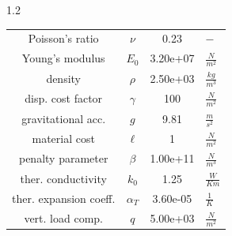 \documentclass[preview]{standalone}
\begin{document}
\begin{spacing}{1.2}
\begin{tabular}{cccl}
\toprule
Poisson's ratio & $\nu$ & 0.23 & $-$ \\ 
Young's modulus & $E_{0}$ & 3.20e+07 & $\frac{N}{m^2}$ \\ 
density & $\rho$ & 2.50e+03 & $\frac{kg}{m^3}$ \\ 
disp. cost factor & $\gamma$ & 100 & $\frac{N}{m^2}$ \\ 
gravitational acc. & $g$ & 9.81 & $\frac{m}{s^2}$ \\ 
material cost & $\ell$ & 1 & $\frac{N}{m^2}$ \\ 
penalty parameter & $\beta$ & 1.00e+11 & $\frac{N}{m^3}$ \\ 
ther. conductivity & $k_{0}$ & 1.25 & $\frac{W}{K m}$ \\ 
ther. expansion coeff. & $\alpha_{T}$ & 3.60e-05 & $\frac{1}{K}$ \\ 
vert. load comp. & $q$ & 5.00e+03 & $\frac{N}{m^2}$ \\ 
\bottomrule
\end{tabular}
\end{spacing}
\end{document}
